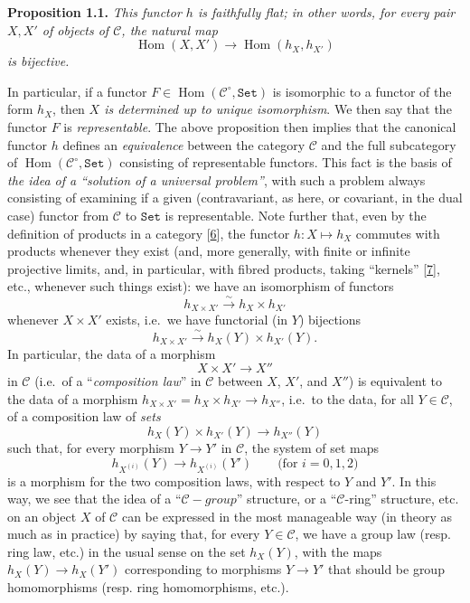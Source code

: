 \documentclass{article}
\newenvironment{itenv}[1]
  {\phantomsection\par\smallskip\noindent\textbf{#1.}\itshape}
  {\par\smallskip}
\newcommand{\oldpage}[1]{\marginpar{\footnotesize$\Big\vert$ \textit{p.~#1}}}
\theoremstyle{definition}
\theoremstyle{definition}
\theoremstyle{definition}
\theoremstyle{definition}
\theoremstyle{remark}
\begin{document}
\leavevmode{}%
\begin{itenv}{Proposition 1.1}
This functor \(h\) is \emph{faithfully flat};
in other words, for every pair \(X,X'\) of objects of \({\mathcal{C}}\), the natural map
\[
\operatorname{Hom}(X,X') \to \operatorname{Hom}(h_X,h_{X'})
\]
is \emph{bijective}.

\end{itenv}

In particular, if a functor \(F\in\operatorname{Hom}({\mathcal{C}}^\circ,\mathtt{Set})\) is isomorphic to a functor of the form \(h_X\), then \emph{\(X\) is determined up to unique isomorphism}.
We then say that the functor \(F\) is \emph{representable}.
The above proposition then implies that the canonical functor \(h\) defines an \emph{equivalence} between the category \({\mathcal{C}}\) and the full subcategory of \(\operatorname{Hom}({\mathcal{C}}^\circ,\mathtt{Set})\) consisting of representable functors.
This fact is the basis of \emph{the idea of a ``solution of a universal problem''}, with such a problem always consisting of examining if a given (contravariant, as here, or covariant, in the dual case) functor from \({\mathcal{C}}\) to \(\mathtt{Set}\) is representable.
\oldpage{195-02}Note further that, even by the definition of products in a category {[}\protect\hyperlink{ref-Gro1957}{6}{]}, the functor \(h\colon X\mapsto h_X\) commutes with products whenever they exist (and, more generally, with finite or infinite projective limits, and, in particular, with fibred products, taking ``kernels'' {[}\protect\hyperlink{ref-Gro1958a}{7}{]}, etc., whenever such things exist): we have an isomorphism of functors
\[
  h_{X\times X'} \xrightarrow{\sim}h_X\times h_{X'}
\]
whenever \(X\times X'\) exists, i.e.~we have functorial (in \(Y\)) bijections
\[
  h_{X\times X'} \xrightarrow{\sim}h_X(Y)\times h_{X'}(Y).
\]
In particular, the data of a morphism
\[
  X\times X' \to X''
\]
in \({\mathcal{C}}\) (i.e.~of a ``\emph{composition law}'' in \({\mathcal{C}}\) between \(X\), \(X'\), and \(X''\)) is equivalent to the data of a morphism \(h_{X\times X'}=h_X\times h_{X'}\to h_{X''}\), i.e.~to the data, for all \(Y\in{\mathcal{C}}\), of a composition law of \emph{sets}
\[
  h_X(Y)\times h_{X'}(Y) \to h_{X''}(Y)
\]
such that, for every morphism \(Y\to Y'\) in \({\mathcal{C}}\), the system of set maps
\[
  h_{X^{(i)}}(Y) \to h_{X^{(i)}}(Y')
  \qquad\text{(for }i=0,1,2\text{)}
\]
is a morphism for the two composition laws, with respect to \(Y\) and \(Y'\).
In this way, we see that the idea of a ``\({\mathcal{C}}-group\)'' structure, or a ``\({\mathcal{C}}\)-ring'' structure, etc. on an object \(X\) of \({\mathcal{C}}\) can be expressed in the most manageable way (in theory as much as in practice) by saying that, for every \(Y\in{\mathcal{C}}\), we have a group law (resp. ring law, etc.) in the usual sense on the set \(h_X(Y)\), with the maps \(h_X(Y)\to h_X(Y')\) corresponding to morphisms \(Y\to Y'\) that should be group homomorphisms (resp. ring homomorphisms, etc.).
\end{document}
